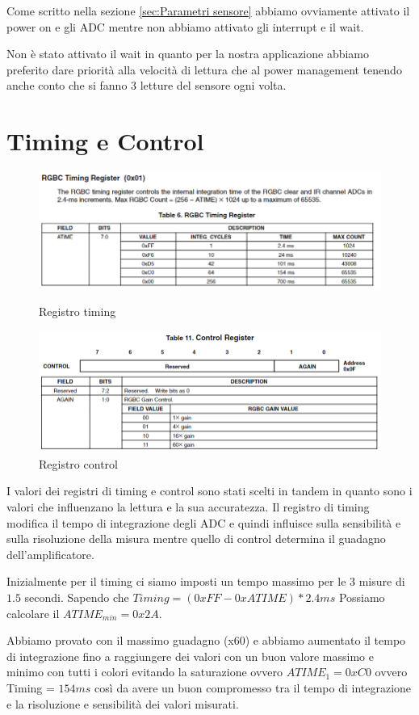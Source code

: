 \documentclass[12pt]{report}
\begin{document}
Come scritto nella sezione \ref{sec:Parametri sensore} abbiamo ovviamente attivato il power on e gli ADC mentre non abbiamo attivato gli interrupt e il wait.

Non è stato attivato il wait in quanto per la nostra applicazione abbiamo preferito dare priorità alla velocità di lettura che al power management tenendo anche conto che si fanno 3 letture del sensore ogni volta.

\section{Timing e Control}
\begin{figure} 
    \includegraphics[width=\textwidth]{Immagini_sensore/registro_timing.png}
    \caption{Registro timing}
    \includegraphics[width=\textwidth]{Immagini_sensore/registro_control.png}
    \caption{Registro control}
\end{figure}
    
I valori dei registri di timing e control sono stati scelti in tandem in quanto sono i valori che influenzano la lettura e la sua accuratezza. Il registro di timing modifica il tempo di integrazione degli ADC e quindi influisce sulla sensibilità e sulla risoluzione della misura mentre quello di control determina il guadagno dell'amplificatore.

Inizialmente per il timing ci siamo imposti un tempo massimo per le 3 misure di $1.5$ secondi. Sapendo che $Timing = (0xFF - 0xATIME) * 2.4ms$ Possiamo calcolare il \(ATIME_{min} = 0x2A\).

Abbiamo provato con il massimo guadagno (x60) e abbiamo aumentato il tempo di integrazione fino a raggiungere dei valori con un buon valore massimo e minimo con tutti i colori evitando la saturazione ovvero \(ATIME_{1} = 0xC0\) ovvero Timing = $154ms$ così da avere un buon compromesso tra il tempo di integrazione e la risoluzione e sensibilità dei valori misurati.
\end{document}
